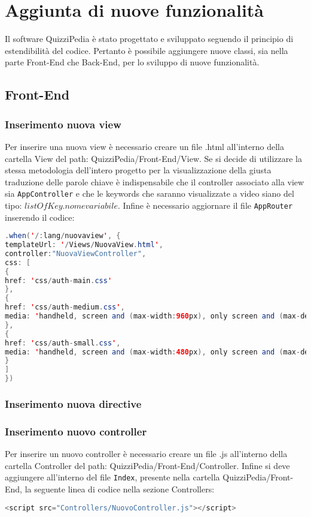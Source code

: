 \section{Aggiunta di nuove funzionalità}
Il software QuizziPedia è stato progettato e sviluppato seguendo il principio di estendibilità del codice. Pertanto è possibile aggiungere nuove classi, sia nella parte Front-End che Back-End, per lo sviluppo di nuove funzionalità.

\subsection{Front-End}

\subsubsection{Inserimento nuova view}
Per inserire una nuova view è necessario creare un file .html all'interno della cartella View del path: QuizziPedia/Front-End/View. Se si decide di utilizzare la stessa metodologia dell'intero progetto per la visualizzazione della giusta traduzione delle parole chiave è indispensabile che il controller associato alla view sia \texttt{AppController} e che le keywords che saranno visualizzate a video siano del tipo: \texttt{$listOfKey.nomevariabile$}. Infine è necessario aggiornare il file \texttt{AppRouter} inserendo il codice:

\begin{lstlisting}[language=Java,firstnumber=1]
.when('/:lang/nuovaview', {
templateUrl: '/Views/NuovaView.html',
controller:"NuovaViewController",
css: [
{
href: 'css/auth-main.css'
},
{
href: 'css/auth-medium.css',
media: 'handheld, screen and (max-width:960px), only screen and (max-device-width:960px)'
},
{
href: 'css/auth-small.css',
media: 'handheld, screen and (max-width:480px), only screen and (max-device-width:480px)'
}
]
})
\end{lstlisting}

\subsubsection{Inserimento nuova directive}

\subsubsection{Inserimento nuovo controller}  
Per inserire un nuovo controller è necessario creare un file .js all'interno della cartella Controller del path: QuizziPedia/Front-End/Controller. Infine si deve aggiungere all'interno del file \texttt{Index}, presente nella cartella QuizziPedia/Front-End, la seguente linea di codice nella sezione Controllers:
\begin{lstlisting}[language=Java,firstnumber=1]
	<script src="Controllers/NuovoController.js"></script>
\end{lstlisting}

